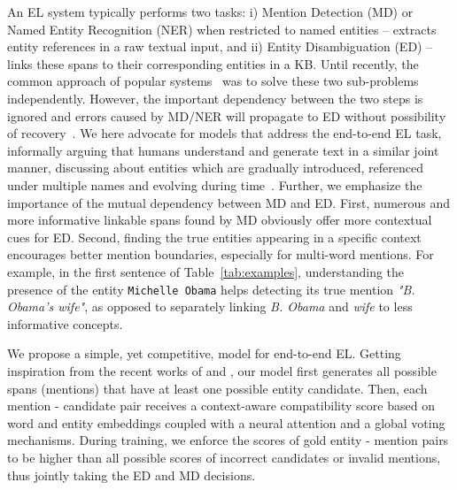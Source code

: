 \documentclass[11pt,a4paper]{article}
\begin{document}
An EL system typically performs two tasks: i) Mention Detection (MD) or Named Entity Recognition (NER) when restricted to named entities -- extracts entity references in a raw textual input, and ii) Entity Disambiguation (ED) -- links these spans to their corresponding entities in a KB. Until recently, the common approach of popular systems~\citep{ceccarelli2013dexter,van2013learning,piccinno2014tagme,daiber2013improving,hoffart2011robust,steinmetz2013semantic} was to solve these two sub-problems independently. However, the important dependency between the two steps is ignored and errors caused by MD/NER will propagate to ED without possibility of recovery~\citep{sil2013re,luo2015joint}. We here advocate for models that address the end-to-end EL task, informally arguing that humans understand and generate text in a similar joint manner, discussing about entities which are gradually introduced, referenced under multiple names and evolving during time~\citep{ji2017dynamic}. Further, we emphasize the importance of the mutual dependency between MD and ED. First, numerous and more informative linkable spans found by MD obviously offer more contextual cues for ED. Second, finding the true entities appearing in a specific context encourages better mention boundaries, especially for multi-word mentions. For example, in the first sentence of Table~\ref{tab:examples}, understanding the presence of the entity \texttt{Michelle Obama} helps detecting its true mention \textit{"B. Obama's wife"}, as opposed to separately linking \textit{B. Obama} and \textit{wife} to less informative concepts.


We propose a simple, yet competitive, model for end-to-end EL. Getting inspiration from the recent works of \citep{lee2017end} and \citep{ganea2017deep}, our model first generates all possible spans (mentions) that have at least one possible entity candidate. Then, each  mention - candidate pair receives a context-aware compatibility score based on word and entity embeddings coupled with a neural attention and a global voting mechanisms. During training, we enforce the scores of gold entity - mention pairs to be higher than all possible scores of incorrect candidates or invalid mentions, thus jointly taking the ED and MD decisions. \\
\end{document}
